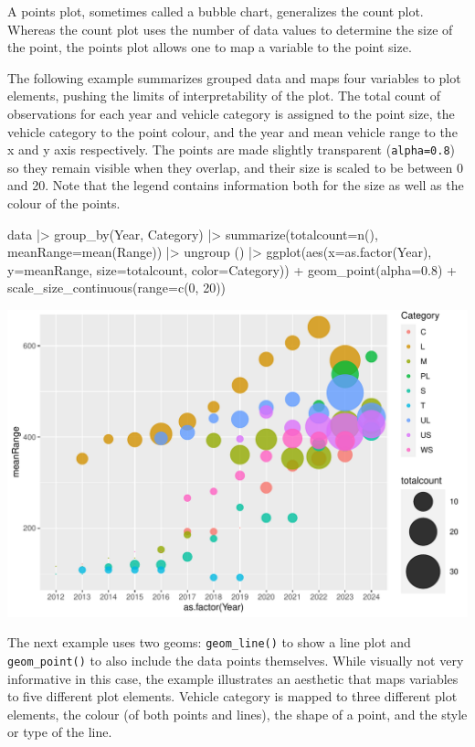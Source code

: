 A points plot, sometimes called a bubble chart, generalizes the count plot. Whereas the count plot uses the number of data values to determine the size of the point, the points plot allows one to map a variable to the point size. 

The following example summarizes grouped data and maps four variables to plot elements, pushing the limits of interpretability of the plot. The total count of observations for each year and vehicle category is assigned to the point size, the vehicle category to the point colour, and the year and mean vehicle range to the x and y axis respectively. The points are made slightly transparent (\texttt{alpha=0.8}) so they remain visible when they overlap, and their size is scaled to be between 0 and 20. Note that the legend contains information both for the size as well as the colour of the points.

\begin{samepage}
\begin{Rcode}
data |> 
  group_by(Year, Category) |>
  summarize(totalcount=n(), meanRange=mean(Range)) |>
  ungroup () |>
  ggplot(aes(x=as.factor(Year), y=meanRange, 
             size=totalcount, color=Category)) +
    geom_point(alpha=0.8) +
    scale_size_continuous(range=c(0, 20))
\end{Rcode}
\end{samepage}

\begin{center}
  \includegraphics[width=.8\textwidth]{fuel.pointsSize.pdf}
\end{center}

The next example uses two geoms: \texttt{geom\_line()} to show a line plot and \texttt{geom\_point()} to also include the data points themselves. While visually not very informative in this case, the example illustrates an aesthetic that maps variables to five different plot elements. Vehicle category is mapped to three different plot elements, the colour (of both points and lines), the shape of a point, and the style or type of the line.

